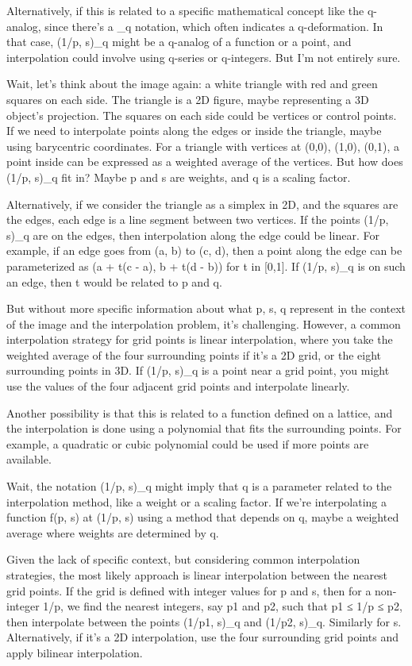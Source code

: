 Alternatively, if this is related to a specific mathematical concept like the q-analog, since there's a _q notation, which often indicates a q-deformation. In that case, (1/p, s)_q might be a q-analog of a function or a point, and interpolation could involve using q-series or q-integers. But I'm not entirely sure. 

Wait, let's think about the image again: a white triangle with red and green squares on each side. The triangle is a 2D figure, maybe representing a 3D object's projection. The squares on each side could be vertices or control points. If we need to interpolate points along the edges or inside the triangle, maybe using barycentric coordinates. For a triangle with vertices at (0,0), (1,0), (0,1), a point inside can be expressed as a weighted average of the vertices. But how does (1/p, s)_q fit in? Maybe p and s are weights, and q is a scaling factor. 

Alternatively, if we consider the triangle as a simplex in 2D, and the squares are the edges, each edge is a line segment between two vertices. If the points (1/p, s)_q are on the edges, then interpolation along the edge could be linear. For example, if an edge goes from (a, b) to (c, d), then a point along the edge can be parameterized as (a + t(c - a), b + t(d - b)) for t in [0,1]. If (1/p, s)_q is on such an edge, then t would be related to p and q. 

But without more specific information about what p, s, q represent in the context of the image and the interpolation problem, it's challenging. However, a common interpolation strategy for grid points is linear interpolation, where you take the weighted average of the four surrounding points if it's a 2D grid, or the eight surrounding points in 3D. If (1/p, s)_q is a point near a grid point, you might use the values of the four adjacent grid points and interpolate linearly. 

Another possibility is that this is related to a function defined on a lattice, and the interpolation is done using a polynomial that fits the surrounding points. For example, a quadratic or cubic polynomial could be used if more points are available. 

Wait, the notation (1/p, s)_q might imply that q is a parameter related to the interpolation method, like a weight or a scaling factor. If we're interpolating a function f(p, s) at (1/p, s) using a method that depends on q, maybe a weighted average where weights are determined by q. 

Given the lack of specific context, but considering common interpolation strategies, the most likely approach is linear interpolation between the nearest grid points. If the grid is defined with integer values for p and s, then for a non-integer 1/p, we find the nearest integers, say p1 and p2, such that p1 ≤ 1/p ≤ p2, then interpolate between the points (1/p1, s)_q and (1/p2, s)_q. Similarly for s. Alternatively, if it's a 2D interpolation, use the four surrounding grid points and apply bilinear interpolation. 

